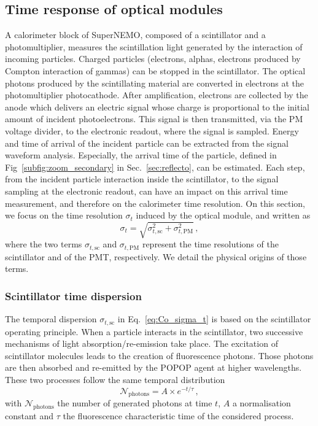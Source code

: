 \subsection{Time response of optical modules}
\label{subsec:OMtimeResponse}

A calorimeter block of SuperNEMO, composed of a scintillator and a photomultiplier, measures the scintillation light generated by the interaction of incoming particles.
Charged particles (electrons, alphas, electrons produced by Compton interaction of gammas) can be stopped in the scintillator.
The optical photons produced by the scintillating material are converted in electrons at the photomultiplier photocathode.
After amplification, electrons are collected by the anode which delivers an electric signal whose charge is proportional to the initial amount of incident photoelectrons.
This signal is then transmitted, via the PM voltage divider, to the electronic readout, where the signal is sampled.
Energy and time of arrival of the incident particle can be extracted from the signal waveform analysis.
Especially, the arrival time of the particle, defined in Fig~\ref{subfig:zoom_secondary} in Sec.~\ref{sec:reflecto}, can be estimated.
Each step, from the incident particle interaction inside the scintillator, to the signal sampling at the electronic readout, can have an impact on this arrival time measurement, and therefore on the calorimeter time resolution.
On this section, we focus on the time resolution $\sigma_{t}$ induced by the optical module, and written as
\begin{equation}
  \sigma_{t}=\sqrt{\sigma_{t,\text{sc}}^{2}+\sigma_{t,\text{PM}}^{2}}\,,
  \label{eq:Co_sigma_t}
\end{equation}
where the two terms $\sigma_{t,\text{sc}}$ and $\sigma_{t,\text{PM}}$ represent the time resolutions of the scintillator and of the PMT, respectively.
We detail the physical origins of those terms.

\subsubsection*{Scintillator time dispersion}
The temporal dispersion $\sigma_{t,\text{sc}}$ in Eq.~\eqref{eq:Co_sigma_t} is based on the  scintillator operating principle.
When a particle interacts in the scintillator, two successive mechanisms of light absorption/re-emission take place.
The excitation of scintillator molecules leads to the creation of fluorescence photons.
Those photons are then absorbed and re-emitted by the POPOP agent at higher wavelengths.
These two processes follow the same temporal distribution
\begin{equation}
\mathcal{N}_{\text{photons}} = A\times e^{-t/\tau}\,,
\label{eq:fluorescence_photons_time}
\end{equation}
with $\mathcal{N}_{\text{photons}}$ the number of generated photons at time $t$, $A$ a normalisation constant and $\tau$ the fluorescence characteristic time of the considered process.

